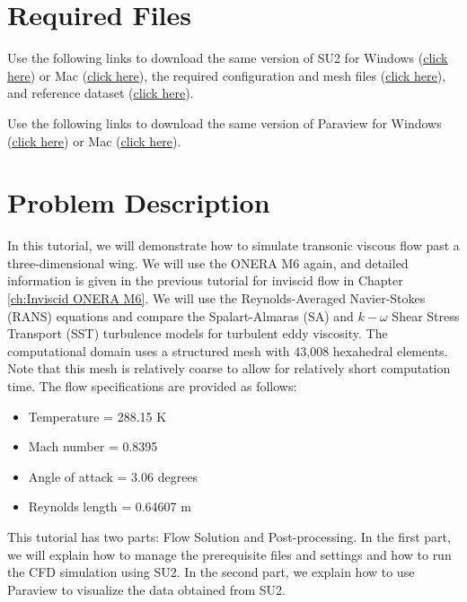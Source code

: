 \section*{Required Files}
\begin{su2note}
	Use the following links to download the same version of SU2 for Windows (\href{https://users.encs.concordia.ca/~bvermeir/book/executables/windows/SU2_Windows.zip}{\underline{click here}}) or Mac (\href{https://users.encs.concordia.ca/~bvermeir/book/executables/osx/SU2_Mac.zip}{\underline{click here}}), the required configuration and mesh files (\href{https://gitlab.com/bvermeir/book-cfd/blob/master/tutorial/tut5_turbulent_oneram6/oneram6_turbulent.zip}{\underline{click here}}), and reference dataset (\href{https://gitlab.com/bvermeir/book-cfd/blob/master/tutorial/tut5_turbulent_oneram6/experimental_values.zip}{\underline{click here}}).
\end{su2note}
\begin{paraviewnote}
	Use the following links to download the same version of Paraview for Windows (\href{https://users.encs.concordia.ca/~bvermeir/book/executables/windows/ParaView-5.4.0-Qt5-OpenGL2-Windows-64bit.exe}{\underline{click here}}) or Mac (\href{https://users.encs.concordia.ca/~bvermeir/book/executables/osx/ParaView-5.4.0-Qt5-OpenGL2-MPI-OSX10.8-64bit.dmg}{\underline{click here}}).
\end{paraviewnote}

\section*{Problem Description}
In this tutorial, we will demonstrate how to simulate transonic viscous flow past a three-dimensional wing. We will use the ONERA M6 again, and detailed information is given in the previous tutorial for inviscid flow in Chapter \ref{ch:Inviscid ONERA M6}. We will use the Reynolds-Averaged Navier-Stokes (RANS) equations and compare the Spalart-Almaras (SA) and $k-\omega$ Shear Stress Transport (SST) turbulence models for turbulent eddy viscosity. The computational domain uses a structured mesh with 43,008 hexahedral elements. Note that this mesh is relatively coarse to allow for relatively short computation time. The flow specifications are provided as follows:
\begin{itemize}
    \item Temperature = 288.15 K
    \item Mach number = 0.8395
    \item Angle of attack = 3.06 degrees
    \item Reynolds length = 0.64607 m
\end{itemize}
This tutorial has two parts: Flow Solution and Post-processing. In the first part, we will explain how to manage the prerequisite files and settings and how to run the CFD simulation using SU2. In the second part, we explain how to use Paraview to visualize the data obtained from SU2.
